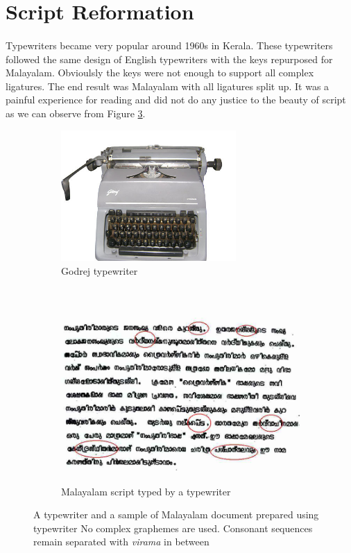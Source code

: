 \documentclass[10pt]{article}
\begin{document}
\section{Script Reformation}

\paragraph{}
Typewriters became very popular around 1960s in Kerala. These typewriters followed the same design of English typewriters with the keys repurposed for Malayalam. Obvioulsly the keys were not enough to support all complex ligatures. The end result was Malayalam with all ligatures split up. It was a painful experience for reading and did not do any justice to the beauty of script as we can observe from Figure \ref{typewriter}.

\begin{figure}[h!]
	\centering
	\begin{subfigure}{.7\textwidth}
		\centering
		\includegraphics[width=\linewidth, height=5cm]{images/godrej-typewriter.jpg}
		\caption{Godrej typewriter}
		\label{godrej}
	\end{subfigure}%
	\\
	\begin{subfigure}{\textwidth}
		\centering
		\includegraphics[width=\linewidth,height=6.5cm]{images/typewritertext4.jpg}
		\caption{Malayalam script typed by a typewriter}
		\label{typewritertext}
	\end{subfigure}
	\caption{A typewriter and a sample of Malayalam document prepared using typewriter No complex graphemes are used. Consonant sequences remain separated with \textit{virama} in between}
	\label{typewriter}
\end{figure}
\end{document}
